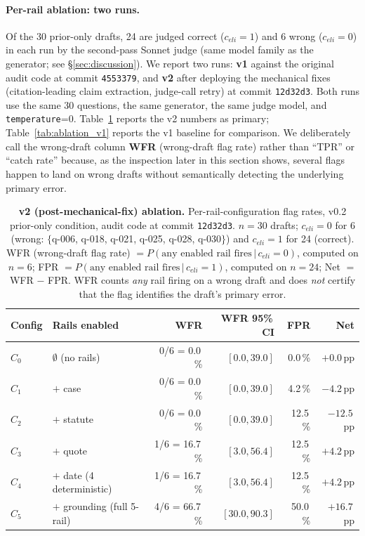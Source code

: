 \documentclass[11pt,a4paper]{article}
\begin{document}
\paragraph{Per-rail ablation: two runs.}
Of the 30 prior-only drafts, 24 are judged correct
($c_{eli} = 1$) and 6 wrong ($c_{eli} = 0$) in each
run by the second-pass Sonnet judge (same model
family as the generator; see
\S\ref{sec:discussion}).  We report two runs:
\textbf{v1} against the original audit code at
commit \texttt{4553379}, and \textbf{v2} after
deploying the mechanical fixes (citation-leading
claim extraction, judge-call retry) at commit
\texttt{12d32d3}.  Both runs use the same 30
questions, the same generator, the same judge model,
and \texttt{temperature}=0.  Table~\ref{tab:ablation}
reports the v2 numbers as primary;
Table~\ref{tab:ablation_v1} reports the v1 baseline
for comparison.  We deliberately call the wrong-draft
column \textbf{WFR} (wrong-draft flag rate) rather
than ``TPR'' or ``catch rate'' because, as the
inspection later in this section shows, several flags
happen to land on wrong drafts without semantically
detecting the underlying primary error.

\begin{table}[h]
\centering
\caption{\textbf{v2 (post-mechanical-fix) ablation.}
Per-rail-configuration flag rates, v0.2 prior-only condition,
audit code at commit \texttt{12d32d3}.  $n=30$ drafts;
$c_{eli}=0$ for 6 (wrong: $\{$q-006, q-018, q-021, q-025,
q-028, q-030$\}$) and $c_{eli}=1$ for 24 (correct).  WFR
(wrong-draft flag rate) $= P(\text{any enabled rail fires}\,|\,
c_{eli}=0)$, computed on $n=6$; FPR $= P(\text{any enabled
rail fires}\,|\,c_{eli}=1)$, computed on $n=24$; Net $=$
WFR $-$ FPR.  WFR counts \emph{any} rail firing on a wrong
draft and does \emph{not} certify that the flag identifies the
draft's primary error.}
\label{tab:ablation}
\begin{tabular}{llrrrr}
\toprule
\textbf{Config} & \textbf{Rails enabled} & \textbf{WFR} & \textbf{WFR 95\%\,CI} & \textbf{FPR} & \textbf{Net} \\
\midrule
$C_0$ & $\emptyset$ (no rails)        & 0/6 = 0.0\,\%  & $[0.0, 39.0]$  & 0.0\,\%   & $+0.0$\,pp \\
$C_1$ & $+$ case                      & 0/6 = 0.0\,\%  & $[0.0, 39.0]$  & 4.2\,\%   & $-4.2$\,pp \\
$C_2$ & $+$ statute                   & 0/6 = 0.0\,\%  & $[0.0, 39.0]$  & 12.5\,\%  & $-12.5$\,pp \\
$C_3$ & $+$ quote                     & 1/6 = 16.7\,\% & $[3.0, 56.4]$  & 12.5\,\%  & $+4.2$\,pp \\
$C_4$ & $+$ date  (4 deterministic)   & 1/6 = 16.7\,\% & $[3.0, 56.4]$  & 12.5\,\%  & $+4.2$\,pp \\
$C_5$ & $+$ grounding (full 5-rail)   & 4/6 = 66.7\,\% & $[30.0, 90.3]$ & 50.0\,\%  & $+16.7$\,pp \\
\bottomrule
\end{tabular}
\end{table}
\end{document}
